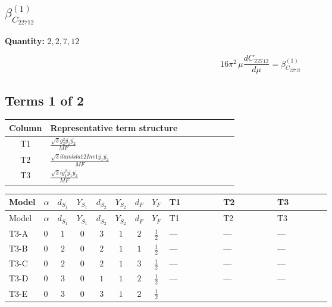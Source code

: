 \documentclass[8pt]{article}
\begin{document}
\begin{landscape}
\section*{$\beta_{C_{22712}}^{(1)}$}
\noindent\textbf{Quantity: }$\mathrm{2,2,7,12}$\par\smallskip
\[16\pi^2\,\mu\frac{d C_{22712}}{d\mu}=\beta_{C_{22712}}^{(1)}\]
\subsection*{Terms 1 of 2}
\begin{center}
\begin{tabular}{@{}c >{\raggedright\arraybackslash}p{0.82\linewidth}@{}}
\toprule
Column & Representative term structure \\
\midrule
T1 & \(\displaystyle \frac{\sqrt{3} g_{2}^{2} \overline{y_{1}} \overline{y_{2}}}{MF}\) \\
\midrule
T2 & \(\displaystyle \frac{\sqrt{3} i lambda12Inv1 \overline{y_{1}} \overline{y_{2}}}{MF}\) \\
\midrule
T3 & \(\displaystyle \frac{\sqrt{3} i g_{1}^{2} \overline{y_{1}} \overline{y_{2}}}{MF}\) \\
\midrule
\bottomrule
\end{tabular}
\end{center}
\smallskip
\tiny
\begin{longtable}{@{}llcccccc >{\raggedright\arraybackslash}p{0.21\linewidth} >{\raggedright\arraybackslash}p{0.21\linewidth} >{\raggedright\arraybackslash}p{0.21\linewidth}@{}}
\toprule
Model & $\alpha$ & $d_{S_1}$ & $Y_{S_1}$ & $d_{S_2}$ & $Y_{S_2}$ & $d_F$ & $Y_F$ & T1 & T2 & T3 \\
\midrule
\endfirsthead
\toprule
Model & $\alpha$ & $d_{S_1}$ & $Y_{S_1}$ & $d_{S_2}$ & $Y_{S_2}$ & $d_F$ & $Y_F$ & T1 & T2 & T3 \\
\midrule
\endhead
T3-A & $0$ & $1$ & $0$ & $3$ & $1$ & $2$ & $\frac{1}{2}$ & --- & --- & --- \\
\midrule
T3-B & $0$ & $2$ & $0$ & $2$ & $1$ & $1$ & $\frac{1}{2}$ & --- & --- & --- \\
\midrule
T3-C & $0$ & $2$ & $0$ & $2$ & $1$ & $3$ & $\frac{1}{2}$ & --- & --- & --- \\
\midrule
T3-D & $0$ & $3$ & $0$ & $1$ & $1$ & $2$ & $\frac{1}{2}$ & --- & --- & --- \\
\midrule
T3-E & $0$ & $3$ & $0$ & $3$ & $1$ & $2$ & $\frac{1}{2}$ & \scriptsize\adjustbox{max width=\linewidth}{$\begin{gathered} \frac{\sqrt{3} g_{2}^{2} \overline{y_{1}} \overline{y_{2}}}{6 MF}\end{gathered}$} & \scriptsize\adjustbox{max width=\linewidth}{$\begin{gathered} - \frac{\sqrt{3} i lambda12Inv1 \overline{y_{1}} \overline{y_{2}}}{6 MF}\end{gathered}$} & \scriptsize\adjustbox{max width=\linewidth}{$\begin{gathered} \frac{\sqrt{3} i g_{1}^{2} \overline{y_{1}} \overline{y_{2}}}{8 MF}\end{gathered}$} \\

\end{longtable}
\end{landscape}
\end{document}
